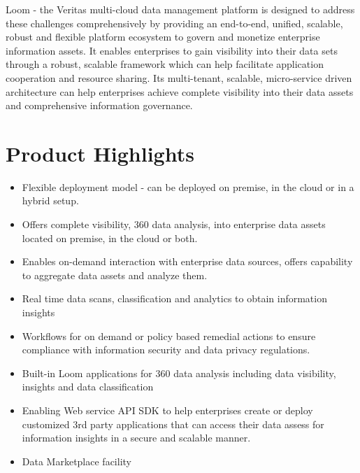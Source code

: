 \documentclass[letterpaper,10pt,english]{sphinxhowto}
\begin{document}
Loom - the Veritas multi-cloud data management platform is designed to address these challenges comprehensively by providing an end-to-end, unified, scalable, robust and flexible platform ecosystem to govern and monetize enterprise information assets. It enables enterprises to gain visibility into their data sets through a robust, scalable framework which can help facilitate application cooperation and resource sharing. Its multi-tenant, scalable, micro-service driven architecture can help enterprises achieve complete visibility into their data assets and comprehensive information governance.


\section{Product Highlights}
\label{\detokenize{col/ds/mcdmp_ds_opt2:product-highlights}}\begin{itemize}
\item {} 
Flexible deployment model - can be deployed on premise, in the cloud or in a hybrid setup.

\item {} 
Offers complete visibility, 360 data analysis, into enterprise data assets located on premise, in the cloud or both.

\item {} 
Enables on-demand interaction with enterprise data sources, offers capability to aggregate data assets and analyze them.

\item {} 
Real time data scans, classification and analytics to obtain information insights

\item {} 
Workflows for on demand or policy based remedial actions to ensure compliance with information security and data privacy regulations.

\item {} 
Built-in Loom applications for 360 data analysis including data visibility, insights and data classification

\item {} 
Enabling Web service API SDK to help enterprises create or deploy customized 3rd party applications that can access their data assess for information insights in a secure and scalable manner.

\item {} 
Data Marketplace facility

\end{itemize}
\end{document}

